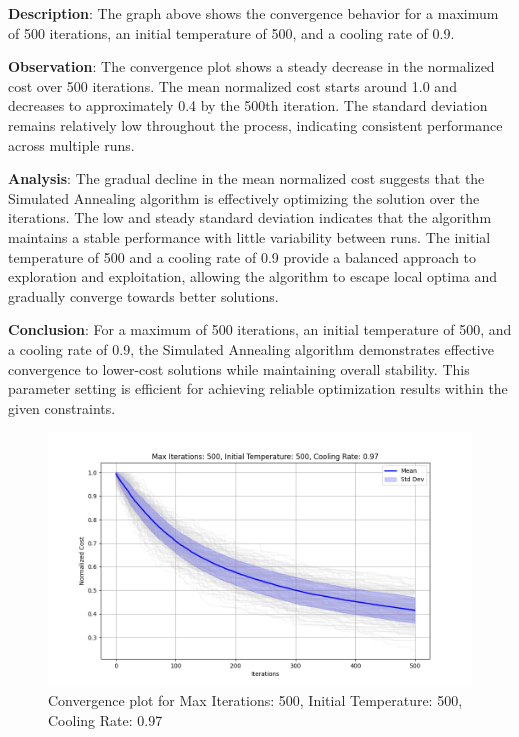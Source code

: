 \documentclass[
]{article}
\begin{document}
    \textbf{Description}: The graph above shows the convergence behavior for a maximum of 500 iterations, an initial temperature of 500, and a cooling rate of 0.9.

    \textbf{Observation}: The convergence plot shows a steady decrease in the normalized cost over 500 iterations. The mean normalized cost starts around 1.0 and decreases to approximately 0.4 by the 500th iteration. The standard deviation remains relatively low throughout the process, indicating consistent performance across multiple runs.

    \textbf{Analysis}: The gradual decline in the mean normalized cost suggests that the Simulated Annealing algorithm is effectively optimizing the solution over the iterations. The low and steady standard deviation indicates that the algorithm maintains a stable performance with little variability between runs. The initial temperature of 500 and a cooling rate of 0.9 provide a balanced approach to exploration and exploitation, allowing the algorithm to escape local optima and gradually converge towards better solutions.

    \textbf{Conclusion}: For a maximum of 500 iterations, an initial temperature of 500, and a cooling rate of 0.9, the Simulated Annealing algorithm demonstrates effective convergence to lower-cost solutions while maintaining overall stability. This parameter setting is efficient for achieving reliable optimization results within the given constraints.

    \begin{figure}[H]
        \centering
        \includegraphics[width=\textwidth]{simulated_annealing/max_iter_500_init_temp_500_cooling_rate_0.97}
        \caption{Convergence plot for Max Iterations: 500, Initial Temperature: 500, Cooling Rate: 0.97}
        \label{fig:sa_500_500_0.97}
    \end{figure}
\end{document}
